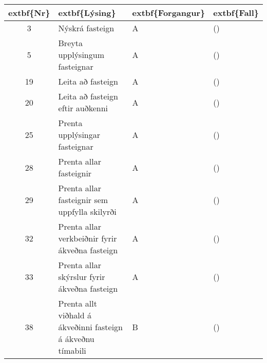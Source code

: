 \documentclass[a4paper]{article}
\begin{document}
\begin{tabular}{|c|p{10cm}|l|l|}
\hline
	extbf\{Nr\}&	extbf\{Lýsing\}&	extbf\{Forgangur\}&	extbf\{Fall\}\\
\hline
3&Nýskrá fasteign&A &()\\
\hline
5&Breyta upplýsingum fasteignar&A &()\\
\hline
19&Leita að fasteign&A &()\\
\hline
20&Leita að fasteign eftir auðkenni&A &()\\
\hline
25&Prenta upplýsingar fasteignar&A &()\\
\hline
28&Prenta allar fasteignir&A &()\\
\hline
29&Prenta allar fasteignir sem uppfylla skilyrði&A &()\\
\hline
32&Prenta allar verkbeiðnir fyrir ákveðna fasteign&A &()\\
\hline
33&Prenta allar skýrslur fyrir ákveðna fasteign&A &()\\
\hline
38&Prenta allt viðhald á ákveðinni fasteign á ákveðnu tímabili&B &()\\
\hline
\end{tabular}
\end{document}

